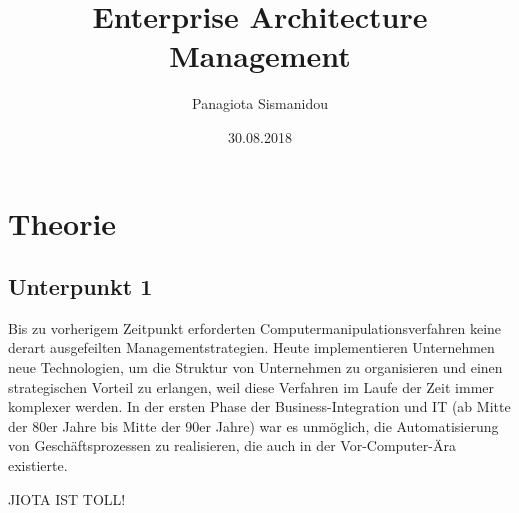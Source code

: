 \documentclass[
	A4paper,
	DIV=9,
	BCOR7mm,
	smallheadings,
	headinclude,
	footinclude,
	headsepline,
	parindent,
	german,
	captions=tableheading,
	abstracton
	]{scrreprt}
\title{Enterprise Architecture Management}
\author{Panagiota Sismanidou}
\date{30.08.2018}
\begin{document}
\maketitle

\tableofcontents

\chapter{Theorie}
\section{Unterpunkt 1}
Bis zu vorherigem Zeitpunkt erforderten Computermanipulationsverfahren keine derart ausgefeilten Managementstrategien. Heute implementieren Unternehmen neue Technologien, um die Struktur von Unternehmen zu organisieren und einen strategischen Vorteil zu erlangen, weil diese Verfahren im Laufe der Zeit immer komplexer werden.	
In der ersten Phase der Business-Integration und IT (ab Mitte der 80er Jahre bis Mitte der 90er Jahre) war es unmöglich, die Automatisierung von Geschäftsprozessen zu realisieren, die auch in der Vor-Computer-Ära existierte.

JIOTA IST TOLL!
\end{document}
